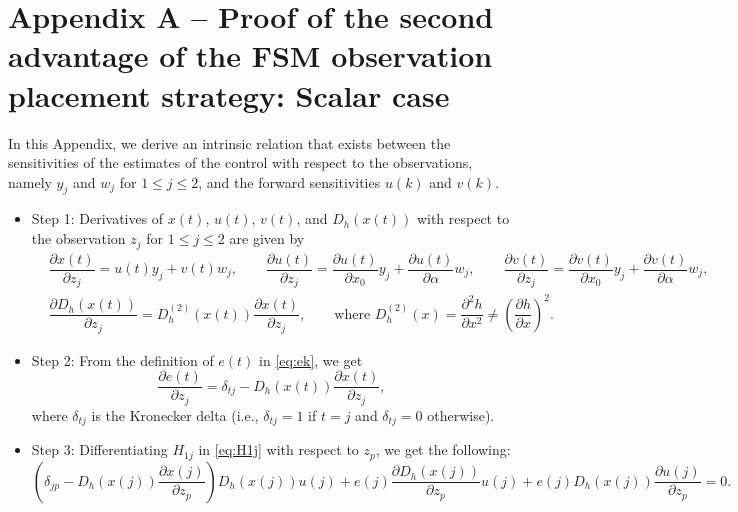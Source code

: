 \documentclass{article}
\begin{document}
\section*{Appendix A -- Proof of the second advantage of the FSM observation placement strategy: Scalar case} \label{sec:appA} \appendix
In this Appendix, we derive an intrinsic relation that exists between the sensitivities of the estimates of the control with respect to the observations, namely $y_j$ and $w_j$ for $1\le j\le 2$, and the forward sensitivities $u(k)$ and $v(k)$.
\begin{itemize}[leftmargin=10pt]
    \item Step 1: Derivatives of $x(t)$, $u(t)$, $v(t)$, and $D_h(x(t))$ with respect to the observation $z_j$ for $1\le j\le 2$ are given by
    \begin{equation}
        \begin{aligned}
            &\dfrac{\partial x(t)}{\partial z_j} = u(t) y_j + v(t) w_j, \qquad 
             \dfrac{\partial u(t)}{\partial z_j} = \dfrac{\partial u(t)}{\partial x_0} y_j + \dfrac{\partial u(t)}{\partial \alpha} w_j, \qquad
             \dfrac{\partial v(t)}{\partial z_j} = \dfrac{\partial v(t)}{\partial x_0} y_j + \dfrac{\partial v(t)}{\partial \alpha} w_j, \\
            &\dfrac{\partial D_h(x(t))}{\partial z_j} = D_h^{(2)} (x(t)) \dfrac{\partial x(t)}{\partial z_j}, \qquad  \text{where } D_h^{(2)}(x) = \dfrac{\partial^2 h}{\partial x^2} \neq \left(\dfrac{\partial h}{\partial x}\right)^2.
        \end{aligned} \label{eq:ddz}
    \end{equation}


    \item Step 2: From the definition of $e(t)$ in \cref{eq:ek}, we get
    \begin{equation}
        \dfrac{\partial e(t)}{\partial z_j} = \delta_{tj} - D_h(x(t)) \dfrac{\partial x(t)}{\partial z_j},
    \end{equation}
    where $\delta_{tj}$ is the Kronecker delta (i.e., $\delta_{tj} = 1$ if $t=j$ and $\delta_{tj} = 0$ otherwise).
    
    \item Step 3: Differentiating $H_{1j}$ in \cref{eq:H1j} with respect to $z_p$, we get the following:
    \begin{equation}
        \left(\delta_{jp} - D_h(x(j)) \dfrac{\partial x(j)}{\partial z_p}\right) D_h(x(j)) u(j) + e(j) \dfrac{\partial D_h(x(j))}{\partial z_p} u(j) + e(j) D_h(x(j)) \dfrac{\partial u(j)}{\partial z_p} = 0 .\label{eq:H1jz}
    \end{equation}


\end{itemize}
\end{document}

